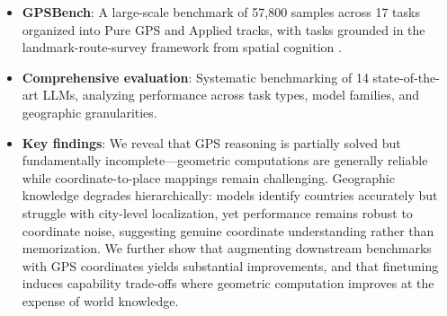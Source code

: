 \begin{itemize}
    \item \textbf{GPSBench}: A large-scale benchmark of 57,800 samples across 17 tasks organized into Pure GPS and Applied tracks, with tasks grounded in the landmark-route-survey framework from spatial cognition \citep{siegel1975development}.

    \item \textbf{Comprehensive evaluation}: Systematic benchmarking of 14 state-of-the-art LLMs, analyzing performance across task types, model families, and geographic granularities.

    \item \textbf{Key findings}: We reveal that GPS reasoning is partially solved but fundamentally incomplete---geometric computations are generally reliable while coordinate-to-place mappings remain challenging. Geographic knowledge degrades hierarchically: models identify countries accurately but struggle with city-level localization, yet performance remains robust to coordinate noise, suggesting genuine coordinate understanding rather than memorization. We further show that augmenting downstream benchmarks with GPS coordinates yields substantial improvements, and that finetuning induces capability trade-offs where geometric computation improves at the expense of world knowledge.
\end{itemize}

